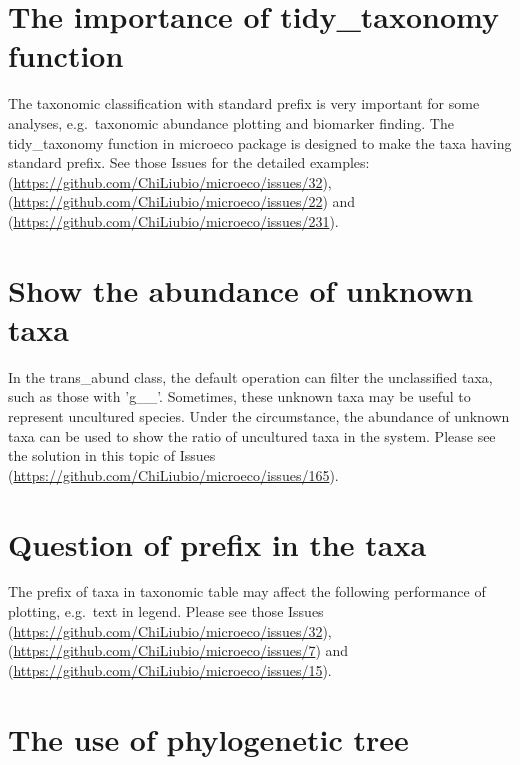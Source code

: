 \documentclass[
]{book}
\begin{document}
\hypertarget{the-importance-of-tidy_taxonomy-function}{%
\section{The importance of tidy\_taxonomy function}\label{the-importance-of-tidy_taxonomy-function}}

The taxonomic classification with standard prefix is very important for some analyses,
e.g.~taxonomic abundance plotting and biomarker finding.
The tidy\_taxonomy function in microeco package is designed to make the taxa having standard prefix.
See those Issues for the detailed examples: (\url{https://github.com/ChiLiubio/microeco/issues/32}), (\url{https://github.com/ChiLiubio/microeco/issues/22})
and (\url{https://github.com/ChiLiubio/microeco/issues/231}).

\hypertarget{show-the-abundance-of-unknown-taxa}{%
\section{Show the abundance of unknown taxa}\label{show-the-abundance-of-unknown-taxa}}

In the trans\_abund class, the default operation can filter the unclassified taxa, such as those with 'g\_\_'.
Sometimes, these unknown taxa may be useful to represent uncultured species.
Under the circumstance, the abundance of unknown taxa can be used to show the ratio of uncultured taxa in the system.
Please see the solution in this topic of Issues (\url{https://github.com/ChiLiubio/microeco/issues/165}).

\hypertarget{question-of-prefix-in-the-taxa}{%
\section{Question of prefix in the taxa}\label{question-of-prefix-in-the-taxa}}

The prefix of taxa in taxonomic table may affect the following performance of plotting, e.g.~text in legend.
Please see those Issues (\url{https://github.com/ChiLiubio/microeco/issues/32}), (\url{https://github.com/ChiLiubio/microeco/issues/7})
and (\url{https://github.com/ChiLiubio/microeco/issues/15}).

\hypertarget{the-use-of-phylogenetic-tree}{%
\section{The use of phylogenetic tree}\label{the-use-of-phylogenetic-tree}}
\end{document}
